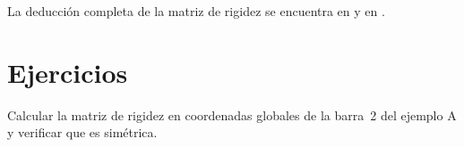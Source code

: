 \documentclass[
  fontsize=10.5pt,
  twoside=true,
  headings=standardclasses,
  numbers=noenddot,
]{scrbook}
\begin{document}
\begin{parasabermas}
La deducción completa de la matriz de rigidez se encuentra en
\textcite{kassimali2012} y en \textcite{mcguire2000}.
\end{parasabermas}

\section*{Ejercicios}

\begin{ejercicio}
Calcular la matriz de rigidez en coordenadas globales de la barra~2 del
ejemplo A y verificar que es simétrica.
\end{ejercicio}


\printbibliography[heading=subbibliography]
\end{document}
